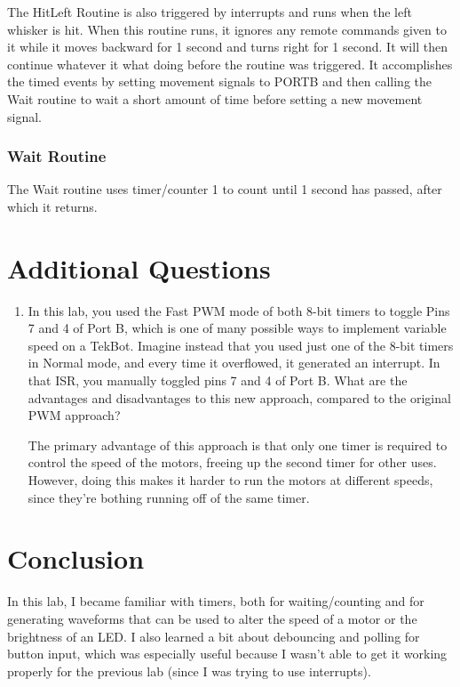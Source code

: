 \documentclass[12pt,letterpaper]{article}
\begin{document}
The HitLeft Routine is also triggered by interrupts and runs when the left
whisker is hit.  When this routine runs, it ignores any remote commands given
to it while it moves backward for 1 second and turns right for 1 second.  It
will then continue whatever it what doing before the routine was triggered.  It
accomplishes the timed events by setting movement signals to PORTB and then
calling the Wait routine to wait a short amount of time before setting a new
movement signal.

\subsubsection{Wait Routine}

The Wait routine uses timer/counter 1 to count until 1 second has passed, after
which it returns.

\section{Additional Questions}
\begin{enumerate}

    \item In this lab, you used the Fast PWM mode of both 8-bit timers to
        toggle Pins 7 and 4 of Port B, which is one of many possible ways to
        implement variable speed on a TekBot. Imagine instead that you used
        just one of the 8-bit timers in Normal mode, and every time it
        overflowed, it generated an interrupt.  In that ISR, you manually
        toggled pins 7 and 4 of Port B. What are the advantages and
        disadvantages to this new approach, compared to the original PWM
        approach?

        The primary advantage of this approach is that only one timer is
        required to control the speed of the motors, freeing up the second
        timer for other uses.  However, doing this makes it harder to run the
        motors at different speeds, since they're bothing running off of the
        same timer.

\end{enumerate}

\section{Conclusion}

In this lab, I became familiar with timers, both for waiting/counting and for
generating waveforms that can be used to alter the speed of a motor or the
brightness of an LED.  I also learned a bit about debouncing and polling for
button input, which was especially useful because I wasn't able to get it
working properly for the previous lab (since I was trying to use interrupts).
\end{document}

